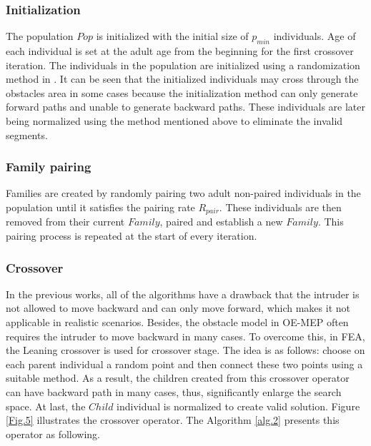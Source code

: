 \documentclass[final]{elsarticle}
\begin{document}
\subsubsection{Initialization}

The population $Pop$ is initialized with the initial size of $p_{min}$ individuals. Age of each individual is set at the adult age from the beginning for the first crossover iteration. The individuals in the population are initialized using a randomization method in \cite{binh2019efficient}. It can be seen that the initialized individuals may cross through the obstacles area in some cases because the initialization method can only generate forward paths and unable to generate backward paths. These individuals are later being normalized using the method mentioned above to eliminate the invalid segments.

\subsubsection{Family pairing}

Families are created by randomly pairing two adult non-paired individuals in the population until it satisfies the pairing rate $R_{pair}$. These individuals are then removed from their current $ Family $, paired and establish a new $Family$. This pairing process is repeated at the start of every iteration.

\subsubsection{Crossover}

In the previous works, all of the algorithms have a drawback that the intruder is not allowed to move backward and can only move forward, which makes it not applicable in realistic scenarios. Besides, the obstacle model in OE-MEP often requires the intruder to move backward in many cases. To overcome this, in FEA, the Leaning crossover is used for crossover stage. The idea is as follows: choose on each parent individual a random point and then connect these two points using a suitable method. As a result, the children created from this crossover operator can have backward path in many cases, thus, significantly enlarge the search space. At last, the $Child$ individual is normalized to create valid solution. Figure \ref{Fig.5} illustrates the crossover operator. The Algorithm \ref{alg.2} presents this operator as following.
\end{document}
